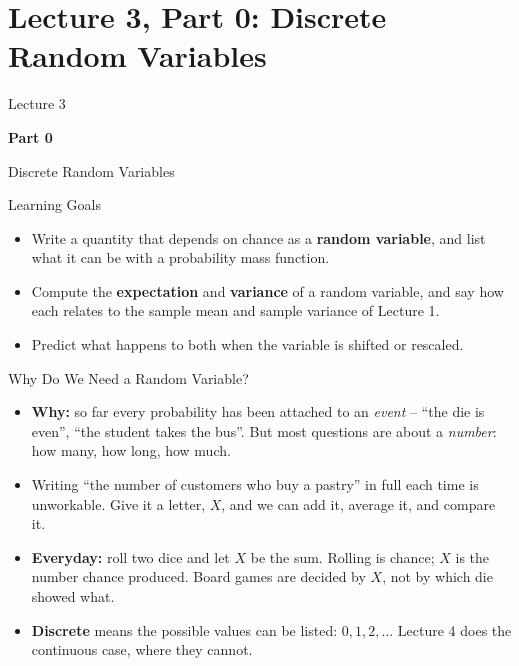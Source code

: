 \section{Lecture 3, Part 0: Discrete Random Variables}

\begin{frame}
\vfill
\centering
{\color{RLBlue}\large Lecture 3}

\vspace{0.3em}
{\color{RLBlue}\Large\bfseries Part 0}

\vspace{0.6em}
{\Large Discrete Random Variables}
\vfill
\end{frame}

\begin{frame}{Learning Goals}
\begin{itemize}
  \item Write a quantity that depends on chance as a \textbf{random variable}, and list what it can be with a probability mass function.
  \pause
  \item Compute the \textbf{expectation} and \textbf{variance} of a random variable, and say how each relates to the sample mean and sample variance of Lecture 1.
  \pause
  \item Predict what happens to both when the variable is shifted or rescaled.
\end{itemize}
\end{frame}

\begin{frame}{Why Do We Need a Random Variable?}
\begin{itemize}
  \item \textbf{Why:} so far every probability has been attached to an \emph{event} -- ``the die is even'', ``the student takes the bus''. But most questions are about a \emph{number}: how many, how long, how much.
  \pause
  \item Writing ``the number of customers who buy a pastry'' in full each time is unworkable. Give it a letter, $X$, and we can add it, average it, and compare it.
  \pause
  \item \textbf{Everyday:} roll two dice and let $X$ be the sum. Rolling is chance; $X$ is the number chance produced. Board games are decided by $X$, not by which die showed what.
  \pause
  \item \textbf{Discrete} means the possible values can be listed: $0, 1, 2, \dots$ Lecture 4 does the continuous case, where they cannot.
\end{itemize}
\end{frame}

